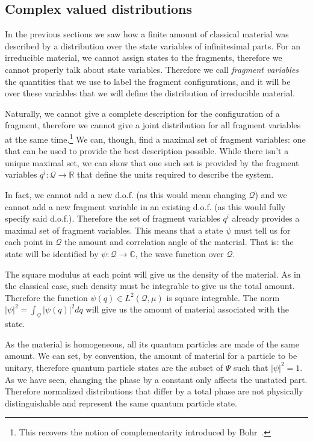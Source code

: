 \documentclass[smallextended]{svjour3}
\numberwithin{equation}{section}
\theoremstyle{definition}
\begin{document}
\subsection{Complex valued distributions}

In the previous sections we saw how a finite amount of classical material was described by a distribution over the state variables of infinitesimal parts. For an irreducible material, we cannot assign states to the fragments, therefore we cannot properly talk about state variables. Therefore we call \emph{fragment variables} the quantities that we use to label the fragment configurations, and it will be over these variables that we will define the distribution of irreducible material.

Naturally, we cannot give a complete description for the configuration of a fragment, therefore we cannot give a joint distribution for all fragment variables at the same time.\footnote{This recovers the notion of complementarity introduced by Bohr~\cite{Bohr}.} We can, though, find a maximal set of fragment variables: one that can be used to provide the best description possible. While there isn't a unique maximal set, we can show that one such set is provided by the fragment variables $q^i : \mathcal{Q} \rightarrow \mathbb{R}$ that define the units required to describe the system.

In fact, we cannot add a new d.o.f. (as this would mean changing $\mathcal{Q}$) and we cannot add a new fragment variable in an existing d.o.f. (as this would fully specify said d.o.f.). Therefore the set of fragment variables $q^i$ already provides a maximal set of fragment variables. This means that a state $\psi$ must tell us for each point in $\mathcal{Q}$ the amount and correlation angle of the material. That is: the state will be identified by $\psi : \mathcal{Q} \rightarrow \mathbb{C}$, the wave function over $\mathcal{Q}$.

The square modulus at each point will give us the density of the material. As in the classical case, such density must be integrable to give us the total amount. Therefore the function $\psi(q) \in L^2(\mathcal{Q}, \mu)$ is square integrable. The norm $|\psi|^2 = \int_{\mathcal{Q}} |\psi(q)|^2 dq$ will give us the amount of material associated with the state.

As the material is homogeneous, all its quantum particles are made of the same amount. We can set, by convention, the amount of material for a particle to be unitary, therefore quantum particle states are the subset of $\Psi$ such that $|\psi|^2 = 1$. As we have seen, changing the phase by a constant only affects the unstated part. Therefore normalized distributions that differ by a total phase are not physically distinguishable and represent the same quantum particle state.
\end{document}
